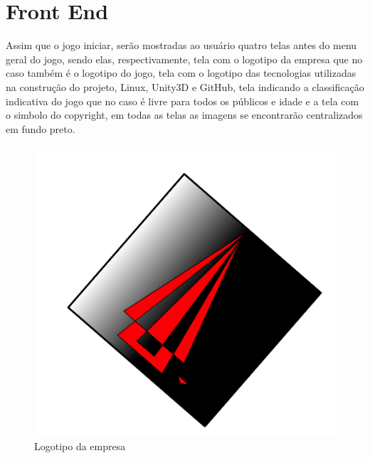 \part{Front End}

Assim que o jogo iniciar, ser\~ao mostradas ao usu\'ario quatro telas antes do menu geral do jogo, sendo elas, respectivamente, tela com o logotipo da empresa que no caso também é o logotipo do jogo, tela com o logotipo das tecnologias utilizadas na constru\c{c}\~ao do projeto, Linux, Unity3D e GitHub, tela indicando a classificação indicativa do jogo que no caso \'e livre para todos os públicos e idade e a tela com o simbolo do copyright, em todas as telas as imagens se encontrarão centralizados em fundo preto.

\begin{figure}[!h]
	\centering
		\includegraphics[keepaspectratio=true,scale=0.4]{figuras/logo}
	\caption{Logotipo da empresa}
\end{figure}

